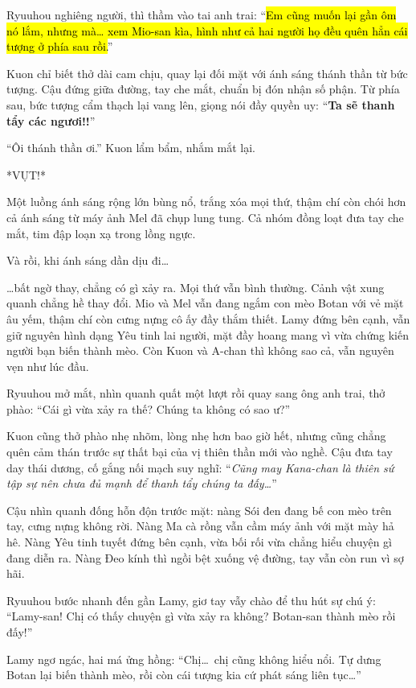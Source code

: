 \documentclass[../main.tex]{subfiles}
\begin{document}
Ryuuhou nghiêng người, thì thầm vào tai anh trai: ``\hl{Em cũng muốn lại gần ôm nó lắm, nhưng mà\dots{} xem Mio-san kìa, hình như cả hai người họ đều quên hẳn cái tượng ở phía sau rồi.}''

Kuon chỉ biết thở dài cam chịu, quay lại đối mặt với ánh sáng thánh thần từ bức tượng. Cậu đứng giữa đường, tay che mắt, chuẩn bị đón nhận số phận. Từ phía sau, bức tượng cẩm thạch lại vang lên, giọng nói đầy quyền uy: ``\textbf{Ta sẽ thanh tẩy các ngươi!!}''

``Ôi thánh thần ơi.'' Kuon lẩm bẩm, nhắm mắt lại.

*VỤT!*

Một luồng ánh sáng rộng lớn bùng nổ, trắng xóa mọi thứ, thậm chí còn chói hơn cả ánh sáng từ máy ảnh Mel đã chụp lung tung. Cả nhóm đồng loạt đưa tay che mắt, tim đập loạn xạ trong lồng ngực.


Và rồi, khi ánh sáng dần dịu đi\dots

\dots bất ngờ thay, chẳng có gì xảy ra. Mọi thứ vẫn bình thường. Cảnh vật xung quanh chẳng hề thay đổi. Mio và Mel vẫn đang ngắm con mèo Botan với vẻ mặt âu yếm, thậm chí còn cưng nựng cô ấy đầy thắm thiết. Lamy đứng bên cạnh, vẫn giữ nguyên hình dạng Yêu tinh lai người, mặt đầy hoang mang vì vừa chứng kiến người bạn biến thành mèo. Còn Kuon và A-chan thì không sao cả, vẫn nguyên vẹn như lúc đầu.

Ryuuhou mở mắt, nhìn quanh quất một lượt rồi quay sang ông anh trai, thở phào: ``Cái gì vừa xảy ra thế? Chúng ta không có sao ư?''

Kuon cũng thở phào nhẹ nhõm, lòng nhẹ hơn bao giờ hết, nhưng cũng chẳng quên cảm thán trước sự thất bại của vị thiên thần mới vào nghề. Cậu đưa tay day thái dương, cố gắng nối mạch suy nghĩ: ``\textit{Cũng may Kana-chan là thiên sứ tập sự nên chưa đủ mạnh để thanh tẩy chúng ta đấy\dots}''

Cậu nhìn quanh đống hỗn độn trước mặt: nàng Sói đen đang bế con mèo trên tay, cưng nựng không rời. Nàng Ma cà rồng vẫn cầm máy ảnh với mặt mày hả hê. Nàng Yêu tinh tuyết đứng bên cạnh, vừa bối rối vừa chẳng hiểu chuyện gì đang diễn ra. Nàng Đeo kính thì ngồi bệt xuống vệ đường, tay vẫn còn run vì sợ hãi.

Ryuuhou bước nhanh đến gần Lamy, giơ tay vẫy chào để thu hút sự chú ý: ``Lamy-san! Chị có thấy chuyện gì vừa xảy ra không? Botan-san thành mèo rồi đấy!''

Lamy ngơ ngác, hai má ửng hồng: ``Chị\dots\ chị cũng không hiểu nổi. Tự dưng Botan lại biến thành mèo, rồi còn cái tượng kia cứ phát sáng liên tục\dots''
\end{document}
